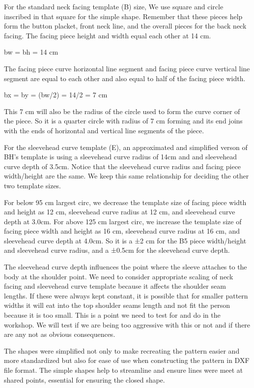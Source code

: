 For the standard neck facing template (B) size, We use square and circle inscribed in that square for the simple shape. Remember that these pieces help form the button placket, front neck line, and the overall pieces for the back neck facing. The facing piece height and width equal each other at 14 cm.

bw = bh = 14 cm

The facing piece curve horizontal line segment and facing piece curve vertical line segment are equal to each other and also equal to half of the facing piece width.

bx = by = (bw/2) = 14/2 = 7 cm

This 7 cm will also be the radius of the circle used to form the curve corner of the piece. So it is a quarter circle with radius of 7 cm forming and its end joins with the ends of horizontal and vertical line segments of the piece.

For the sleevehead curve template (E), an approximated and simplified verson of BH's template is using a sleevehead curve radius of 14cm and and sleevehead curve depth of 3.5cm. Notice that the sleevehead curve radius and facing piece width/height are the same. We keep this same relationship for deciding the other two template sizes.

For below 95 cm largest circ, we decrease the template size of facing piece width and height as 12 cm, sleevehead curve radius at 12 cm, and sleevehead curve depth at 3.0cm.
For above 125 cm largest circ, we increase the template size of facing piece width and height as 16 cm, sleevehead curve radius at 16 cm, and sleevehead curve depth at 4.0cm.
So it is a ±2 cm for the B5 piece width/height and sleevehead curve radius, and a ±0.5cm for the sleevehead curve depth.

The sleevehead curve depth influences the point where the sleeve attaches to the body at the shoulder point. We need to consider appropriate scaling of neck facing and sleevehead curve template because it affects the shoulder seam lengths. If these were always kept constant, it is possible that for smaller pattern widths it will eat into the top shoulder seams length and not fit the person because it is too small. This is a point we need to test for and do in the workshop. We will test if we are being too aggressive with this or not and if there are any not as obvious consequences.

The shapes were simplified not only to make recreating the pattern easier and more standardized but also for ease of use when constructing the pattern in DXF file format. The simple shapes help to streamline and ensure lines were meet at shared points, essential for ensuring the closed shape. 

